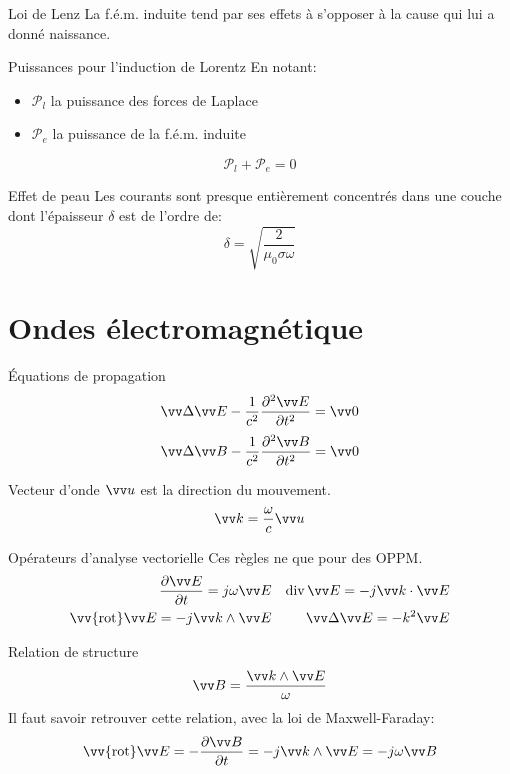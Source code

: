 \documentclass[french, a4paper, 11pt, twocolumn]{article}
\DeclareMathOperator{\diverg}{div}        %
\newcommand{\rota}{\vv{\mathrm{rot}}}    %
\begin{document}
\begin{cadre}{Loi de Lenz}
  \og La f.é.m. induite tend par ses effets à s'opposer à la cause qui lui a donné naissance.\fg{}
\end{cadre}

\begin{cadre}{Puissances pour l'induction de Lorentz}
  En notant:
  \begin{itemize}
    \item \(\mathcal{P}_{l}\) la puissance des forces de Laplace
    \item \(\mathcal{P}_{e}\) la puissance de la f.é.m. induite
  \end{itemize}
  \[\mathcal{P}_{l}+\mathcal{P}_{e} = 0\]
\end{cadre}

\begin{cadre}{Effet de peau}
  Les courants sont presque entièrement concentrés dans une couche dont l'épaisseur \(\delta\) est de l'ordre de:
  \[\delta = \sqrt{\dfrac{2}{\mu_{0}\sigma\omega}}\]
\end{cadre}

\section{Ondes électromagnétique}
\begin{cadre}{Équations de propagation}
  \[\vv\Delta \vv E - \dfrac{1}{c^{2}}\dfrac{\partial^{2}\vv E}{\partial t^{2}} = \vv 0\]
  \[\vv\Delta \vv B - \dfrac{1}{c^{2}}\dfrac{\partial^{2}\vv B}{\partial t^{2}} = \vv 0\]
\end{cadre}

\begin{cadre}{Vecteur d'onde}
  \(\vv u\) est la direction du mouvement.
  \[\vv k = \dfrac{\omega}{c}\vv u\]
\end{cadre}

\begin{cadre}{Opérateurs d'analyse vectorielle}
  Ces règles ne que pour des OPPM.
  \begin{align*}
    \dfrac{\partial\vv E}{\partial t} = j\omega\vv E && \diverg\vv E = -j\vv k\cdot\vv E \\
    \rota\vv E = -j\vv k\wedge\vv E && \vv\Delta\vv E = -k^{2}\vv E
  \end{align*}
\end{cadre}

\begin{cadre}{Relation de structure}
  \[\vv B=\dfrac{\vv k\wedge\vv E}{\omega}\]
  Il faut savoir retrouver cette relation, avec la loi de Maxwell-Faraday:
  \[\rota\vv E = -\dfrac{\partial\vv B}{\partial t} = -j\vv k\wedge\vv E = -j\omega\vv B\]
\end{cadre}
\end{document}
